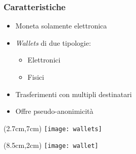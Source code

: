 \begin{frame}
 \frametitle{Caratteristiche}
 
 \begin{itemize}
  \item<1-> Moneta solamente elettronica
  \item<2-> \textit{Wallets} di due tipologie: %
  \begin{itemize}
   \item Elettronici
   \item Fisici
  \end{itemize}
  \item<3-> Trasferimenti con multipli destinatari
  \item<4-> Offre pseudo-anonimicità
 \end{itemize}
 
 
 \begin{textblock*}{5cm}(2.7cm,7cm)
  \texttt{[image: wallets]}
 \end{textblock*}
 
 
 \begin{textblock*}{5cm}(8.5cm,2cm)
  \texttt{[image: wallet]}
 \end{textblock*}

 
\end{frame}
